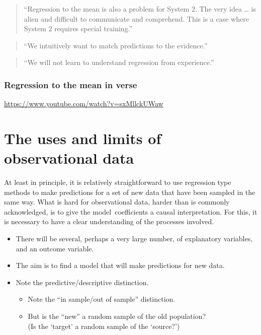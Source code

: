 \documentclass[
  10pt,
  b5paper]{book}
\providecommand{\tightlist}{%
  \setlength{\itemsep}{0pt}\setlength{\parskip}{0pt}}
\begin{document}
\begin{quote}
``Regression to the mean is also a problem for System 2. The very idea
\ldots{} is alien and difficult to communicate and comprehend. This is a
case where System 2 requires special training.''
\end{quote}

\begin{quote}
``We intuitively want to match predictions to the evidence.''
\end{quote}

\begin{quote}
``We will not learn to understand regression from experience.''
\end{quote}

\hypertarget{regression-to-the-mean-in-verse}{%
\subsection*{Regression to the mean in verse}\label{regression-to-the-mean-in-verse}}

\url{https://www.youtube.com/watch?v=sxMllckUWaw}

\hypertarget{the-uses-and-limits-of-observational-data}{%
\chapter{The uses and limits of observational data}\label{the-uses-and-limits-of-observational-data}}

At least in principle, it is relatively straightforward to use
regression type methods to make predictions for a set of new
data that have been sampled in the same way. What is hard for
observational data, harder than is commonly acknowledged,
is to give the model~coefficients a causal interpretation.
For this, it is necessary to have a clear understanding of the
processes involved.

\begin{itemize}
\tightlist
\item
  There will be several, perhaps a very large number,
  of explanatory variables, and an outcome variable.
\item
  The aim is to find a model that will make predictions for new data.
\item
  Note the predictive/descriptive distinction.

  \begin{itemize}
  \tightlist
  \item
    Note the ``in sample/out of sample'' distinction.
  \item
    But is the ``new'' a random sample of the old population?\\
    (Is the `target' a random sample of the `source?')
  \end{itemize}
\end{itemize}
\end{document}
